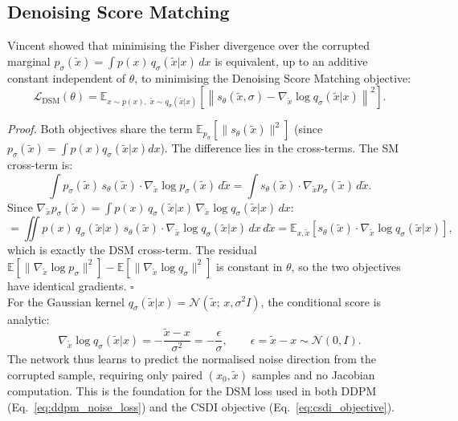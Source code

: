 \subsection{Denoising Score Matching}
\label{app:subsec:dsm}

Vincent \cite{vincent2011connection} showed that minimising the Fisher divergence
over the corrupted marginal $p_\sigma(\tilde{x}) = \int p(x)\,q_\sigma(\tilde{x}
|x)\,dx$ is equivalent, up to an additive constant independent of $\theta$, to
minimising the Denoising Score Matching objective:
\[
    \mathcal{L}_{\text{DSM}}(\theta)
    = \mathbb{E}_{x \sim p(x),\;\tilde{x} \sim q_\sigma(\tilde{x}|x)}
    \!\left[\left\|s_\theta(\tilde{x},\sigma)
    - \nabla_{\tilde{x}}\log q_\sigma(\tilde{x}|x)\right\|^2\right].
\]

\textit{Proof.} Both objectives share the term $\mathbb{E}_{p_\sigma}
[\|s_\theta(\tilde{x})\|^2]$ (since $p_\sigma(\tilde{x}) = \int p(x)
q_\sigma(\tilde{x}|x)dx$). The difference lies in the cross-terms. The SM
cross-term is:
\[
    \int p_\sigma(\tilde{x})\,s_\theta(\tilde{x})\cdot
    \nabla_{\tilde{x}}\log p_\sigma(\tilde{x})\,d\tilde{x}
    = \int s_\theta(\tilde{x})\cdot\nabla_{\tilde{x}} p_\sigma(\tilde{x})\,d\tilde{x}.
\]
Since $\nabla_{\tilde{x}} p_\sigma(\tilde{x})
= \int p(x)\,q_\sigma(\tilde{x}|x)\,\nabla_{\tilde{x}}\log q_\sigma(\tilde{x}|x)\,dx$:
\[
    = \iint p(x)\,q_\sigma(\tilde{x}|x)\,s_\theta(\tilde{x})
    \cdot\nabla_{\tilde{x}}\log q_\sigma(\tilde{x}|x)\,dx\,d\tilde{x}
    = \mathbb{E}_{x,\tilde{x}}\!\left[s_\theta(\tilde{x})
    \cdot\nabla_{\tilde{x}}\log q_\sigma(\tilde{x}|x)\right],
\]
which is exactly the DSM cross-term. The residual $\mathbb{E}[\|\nabla_{\tilde{x}}
\log p_\sigma\|^2] - \mathbb{E}[\|\nabla_{\tilde{x}}\log q_\sigma\|^2]$ is
constant in $\theta$, so the two objectives have identical gradients. $\square$\\

For the Gaussian kernel $q_\sigma(\tilde{x}|x)=\mathcal{N}(\tilde{x};\,x,
\sigma^2 I)$, the conditional score is analytic:
\[
    \nabla_{\tilde{x}}\log q_\sigma(\tilde{x}|x)
    = -\frac{\tilde{x} - x}{\sigma^2}
    = -\frac{\epsilon}{\sigma}, \qquad
    \epsilon = \tilde{x} - x \sim \mathcal{N}(0, I).
\]
The network thus learns to predict the normalised noise direction from the
corrupted sample, requiring only paired $(x_0, \tilde{x})$ samples and no
Jacobian computation. This is the foundation for the DSM loss used in both
DDPM (Eq.~\ref{eq:ddpm_noise_loss}) and the CSDI objective
(Eq.~\ref{eq:csdi_objective}).

